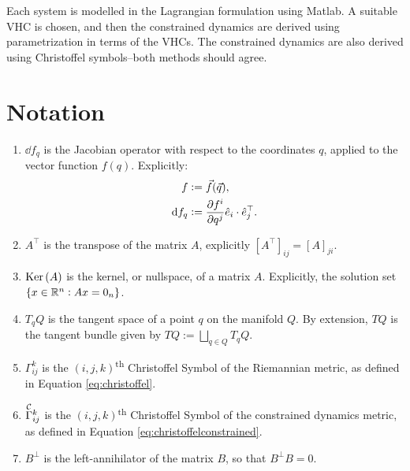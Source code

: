 \documentclass[main.tex]{subfiles}
\begin{document}
Each system is modelled in the Lagrangian formulation using Matlab. A suitable VHC is chosen, and then the constrained dynamics are derived using parametrization in terms of the VHCs. The constrained dynamics are also derived using Christoffel symbols--both methods should agree.

\section{Notation}
\begin{enumerate}[(1)]
    \item\label{def:jacobian} $\dd f_q$ is the Jacobian operator with respect to the coordinates $q$, applied to the vector function $f(q)$. Explicitly:
    \begin{align}
        f&:=\Vec{f}(\Vec{q}),\\
        \dd f_q&:= \pdv{f^i}{q^j}\hat{e}_i\cdot\hat{e}^\top_j.
    \end{align}
    \item $A^\top$ is the transpose of the matrix $A$, explicitly $[A^\top]_{ij}=[A]_{ji}$.
    \item $\Ker{A}$ is the kernel, or nullspace, of a matrix $A$. Explicitly, the solution set $\cbr{x\in\ree^n:Ax=0_n}$.
    \item $T_qQ$ is the tangent space of a point $q$ on the manifold $Q$. By extension, $TQ$ is the tangent bundle given by $TQ:=\bigsqcup_{q\in Q} T_qQ.$
    \item $\Gamma^k_{ij}$ is the $(i,j,k)$\textsuperscript{th} Christoffel Symbol of the Riemannian metric, as defined in Equation \ref{eq:christoffel}.
    \item $\Gammac{k}{ij}$ is the $(i,j,k)$\textsuperscript{th} Christoffel Symbol of the constrained dynamics metric, as defined in Equation \ref{eq:christoffelconstrained}.
    \item $B^\bot$ is the left-annihilator of the matrix $B$, so that $B^\bot B=0$.
\end{enumerate}
\end{document}
